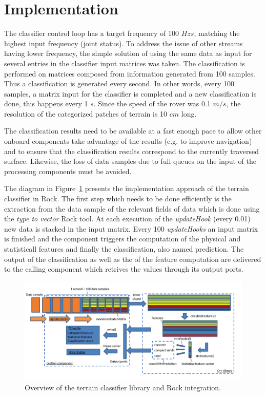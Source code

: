 \documentclass{article}
\begin{document}
\section{Implementation}

The classifier control loop has a target frequency of 100 $Hzs$, matching the highest input frequency (joint status). 
To address the issue of other streams having lower frequency, the simple solution of using the same data as input for several entries in the classifier input matrices was taken. 
The classification is performed on matrices composed from information generated from 100 samples. 
Thus a classification is generated every second.
In other words, every 100 samples, a matrix input for the classifier is completed and a new classification is done, this happens every 1 $s$.
Since the speed of the rover was 0.1 $m/s$, the resolution of the categorized patches of terrain is 10 $cm$ long.  


The classification results need to be available at a fast enough pace to allow other onboard components take advantage of the results (e.g. to improve navigation) and to ensure that the classification results correspond to the currently traversed surface. 
Likewise, the loss of data samples due to full queues on the input of the processing components must be avoided. 

The diagram in Figure~\ref{fig:overview} presents the implementation approach of the terrain classifier in Rock. 
The first step which needs to be done efficiently is the extraction from the data sample of the relevant fields of data which is done using the \emph{type to vector} Rock tool.
At each execution of the \emph{updateHook} (every 0.01) new data is stacked in the input matrix.
Every 100 \emph{updateHooks} an input matrix is finished and the component triggers the computation of the physical and statisticall features and finally the classification, also named prediction.
The output of the classification as well as the of the feature computation are delivered to the calling component which retrives the values through its output ports. 

\begin{figure}[htb!]
    \centering
    \includegraphics[width=\textwidth]{../figures/OverviewTC2.pdf}
    \caption{\label{fig:overview}Overview of the terrain classifier library and Rock integration.}
\end{figure}
\end{document}
